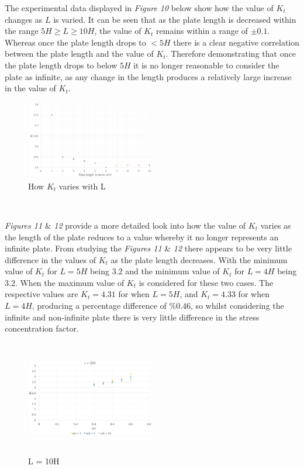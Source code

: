 \documentclass[11pt,twocolumn]{article} %
\begin{document}
 The experimental data displayed in \textit{Figure 10} below show how the value of $K_{t}$ changes as $L$ is varied. It can be seen that as the plate length is decreased within the range $5H \geq L \geq 10H$, the value of $K_{t}$  remains within a range of $\pm0.1$. Whereas once the plate length drops to $<5H$ there is a clear negative correlation between the plate length and the value of $K_{t}$. Therefore demonstrating that once the plate length drops to below $5H$ it is no longer reasonable to consider the plate as infinite, as any change in the length produces a relatively large increase in the value of $K_{t}$.
\begin{figure}[!ht]
\centering
\includegraphics[width=0.5\textwidth]{Lvar.png}
\caption{How $K_{t}$ varies with L}
\end{figure}
\linebreak\linebreak\linebreak\linebreak
\\ \par
\textit{Figures 11} \& \textit{12} provide a more detailed look into how the value of $K_{t}$ varies as the length of the plate reduces to a value whereby it no longer represents an infinite plate. From studying the \textit{Figures 11} \& \textit{12} there appears to be very little difference in the values of $K_{t}$ as the plate length decreases. With the minimum value of $K_{t}$ for $L=5H$ being $3.2$ and the minimum value of $K_{t}$ for $L=4H$ being $3.2$. When the maximum value of $K_{t}$ is considered for these two cases. The respective values are $K_{t}=4.31$ for when $L=5H$, and $K_{t}=4.33$ for when $L=4H$, producing a percentage difference of $\%0.46$, so whilst considering the infinite and non-infinite plate there is very little difference in the stress concentration factor. 
\begin{figure}[!ht]
    	\includegraphics[height=5cm,width=0.5\textwidth]{L10.png}
    	\caption{L = 10H}
\end{figure}
\end{document}
